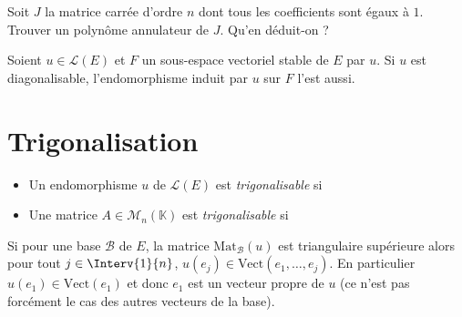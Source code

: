 \documentclass[a4paper,10pt]{report}
\begin{document}
 \begin{exa} Soit $J$ la matrice carrée d'ordre $n$ dont tous les coefficients sont égaux à $1$. Trouver un polynôme annulateur de $J$. Qu'en déduit-on ?
 \end{exa}
 
 \begin{cor} Soient $u \in \mathcal{L}(E)$ et $F$ un sous-espace vectoriel stable de $E$ par $u$. Si $u$ est diagonalisable, l'endomorphisme induit par $u$ sur $F$ l'est aussi.
 \end{cor}
 
 \begin{preuve} 
 
 \vspace{5cm}
 \end{preuve}
 
 \section{Trigonalisation}
 
 \begin{defin} 
 
 \begin{itemize}
 \item Un endomorphisme $u$ de $\mathcal{L}(E)$ est \textit{trigonalisable} si 

\medskip

 \item Une matrice $A \in \mathcal{M}_n(\mathbb{K})$ est \textit{trigonalisable} si
 
 \medskip
 
 \end{itemize}
 \end{defin}
 
 \begin{rem} Si pour une base $\mathcal{B}$ de $E$, la matrice $\textrm{Mat}_{\mathcal{B}}(u)$ est triangulaire supérieure alors pour tout $j \in \Interv{1}{n}$, $u(e_j) \in \textrm{Vect}(e_1, \ldots, e_j)$. En particulier $u(e_1) \in \textrm{Vect}(e_1)$ et donc $e_1$ est un vecteur propre de $u$ (ce n'est pas forcément le cas des autres vecteurs de la base).
 \end{rem}
 
\end{document}
